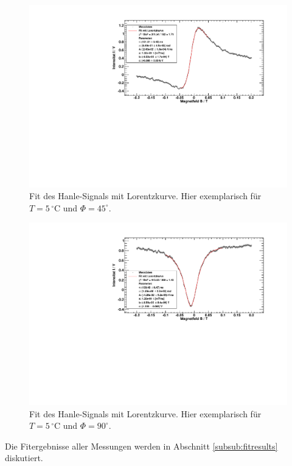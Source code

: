 \begin{figure}[H]
\begin{center}
  \includegraphics[width=\textwidth]{../img/fit_45_p05.pdf}
  \caption{Fit des Hanle-Signals mit Lorentzkurve. Hier exemplarisch für $T=5\,{}^\circ$C und $\Phi=45^\circ$.}
  \label{img:fit:lorentz:45}
\end{center}
\end{figure}
\begin{figure}[H]
\begin{center}
  \includegraphics[width=\textwidth]{../img/fit_90_p05_6.pdf}
  \caption{Fit des Hanle-Signals mit Lorentzkurve. Hier exemplarisch für $T=5\,{}^\circ$C und $\Phi=90^\circ$.}
  \label{img:fit:lorentz:90}
\end{center}
\end{figure}
Die Fitergebnisse aller Messungen werden in Abschnitt \ref{subsub:fitresults} diskutiert.

